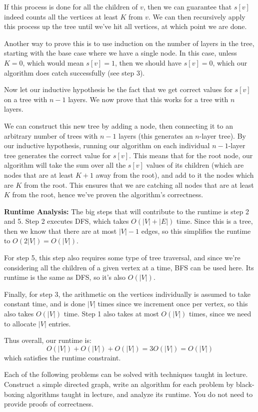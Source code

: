 \documentclass[10.5pt]{article}
\begin{document}
\begin{solution}
	If this process is done for all the children of $v$, then we can guarantee that $s[v]$ indeed counts 
	all the vertices at least $K$ from $v$. We can then recursively apply this process up the tree until 
	we've hit all vertices, at which point we are done. 

	Another way to prove this is to use induction on the number of layers in the tree, 
	starting with the base case where we have a single node.
	In this case, unless $K =0$, which would mean $s[v] = 1$, then we should have $s[v] = 0$, which 
	our algorithm does catch successfully (see step 3).

	Now let our inductive hypothesis be the fact that we get correct values for $s[v]$ on a tree with 
	$n-1$ layers. We now prove that this works for a tree with $n$ layers. 

	We can construct this new tree by adding a node, then connecting it to an arbitrary number of trees 
	with $n-1$ layers (this generates an $n$-layer tree). By our inductive hypothesis, running 
	our algorithm on each individual $n-1$-layer tree generates the correct value for $s[v]$. This 
	means that for the root node, our algorithm will take the sum over all the $s[v]$ values of its 
	children (which are nodes that are at least $K+1$ away from the root), and add to it the nodes which are 
	$K$ from the root. This ensures that we are catching all nodes that are at least $K$ from the root, 
	hence we've proven the algorithm's correctness.

	\textbf{Runtime Analysis:} The big steps that will contribute to the runtime is step 2 and 5. Step 
	2 executes DFS, which takes $O(|V| + |E|)$ time. Since this is a tree, then we know that 
	there are at most $|V| - 1$ edges, so this simplifies the runtime to $O(2|V|) = O(|V|)$. 

	For step 5, this step also requires some type of tree traversal, and since we're considering 
	all the children of a given vertex at a time, BFS can be used here. Its runtime is the same 
	as DFS, so it's also $O(|V|)$. 

	Finally, for step 3, the arithmetic on the vertices individually is assumed to take constant time, 
	and is done $|V|$ times 
	since we increment once per vertex, so this also takes $O(|V|)$ time. Step 1 also takes at most 
	$O(|V|)$ times, since we need to allocate $|V|$ entries.

	Thus overall, our runtime is:
	\[
	O(|V|) + O(|V|) + O(|V|) = 3O(|V|) = O(|V|)
	\] 
	which satisfies the runtime constraint.
\end{solution}
\pagebreak
{}
Each of the following problems can be solved with techniques taught in lecture. Construct a simple directed graph, write an algorithm for each problem by black-boxing algorithms taught in lecture, and analyze its runtime. You do not need to provide proofs of correctness.
\end{document}
